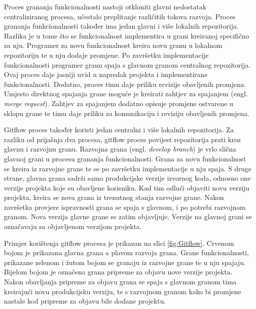 \documentclass[times, utf8, diplomski, numeric]{fer}
\newcommand{\eng}[1]{(engl. \textit{#1})}
\begin{document}
Proces grananja funkcionalnosti nastoji otkloniti glavni nedostatak centraliziranog procesa, učestalo preplitanje različitih tokova razvoja. Proces grananja funkcionalnosti također ima jedan glavni i više lokalnih repozitorija. Razlika je u tome što se funkcionalnost implementira u grani kreiranoj specifično za nju. Programer za novu funkcionalnost kreira novu granu u lokalnom repozitoriju te u nju dodaje promjene. Po završetku implementacije funkcionalnosti programer granu spaja s glavnom granom centralnog repozitorija. Ovaj proces daje jasniji uvid u napredak projekta i implementirane funkcionalnosti. Dodatno, proces timu daje priliku revizije obavljenih promjena. Umjesto direktnog spajanja grane moguće je kreirati zahtjev za spajanjem \eng{merge request}. Zahtjev za spajanjem dodatno opisuje promjene ostvarene u sklopu grane te timu daje priliku za komunikaciju i reviziju obavljenih promjena.

Gitflow proces također koristi jedan centralni i više lokalnih repozitorija. Za razliku od prijašnja dva procesa, gitflow proces povijest repozitorija prati kroz glavnu i razvojnu granu. Razvojna grana \eng{develop branch} je vrlo slična glavnoj grani u procesu grananja funkcionalnosti. Grana za novu funkcionalnost se kreira iz razvojne grane te se po završetku implementacije u nju spaja. S druge strane, glavna grana sadrži samo produkcijske verzije izvornog koda, odnosno one verzije projekta koje su obavljene korisniku. Kad tim odluči objaviti novu verziju projekta, kreira se nova grana iz trenutnog stanja razvojne grane. Nakon završetka provjere ispravnosti grana se spaja s glavnom, i po potrebi razvojnom granom. Nova verzija glavne grane se zatim objavljuje. Verzije na glavnoj grani se označavaju sa objavljenom verzijom projekta.

Primjer korištenja gitflow procesa je prikazan na slici \ref{fig:Gitflow}. Crvenom bojom je prikazana glavna grana a plavom razvoja grana. Grane funkcionalnosti, prikazane zelenom i žutom bojom se granaju iz razvojne grane te u nju spajaju. Bijelom bojom je označena grana pripreme za objavu nove verzije projekta. Nakon obavljanja pripreme za objavu grana se spaja s glavnom granom tima kreirajući novu produkcijsku verziju, te s razvojnom granom kako bi promjene nastale kod pripreme za objavu bile dodane projektu.
\end{document}
